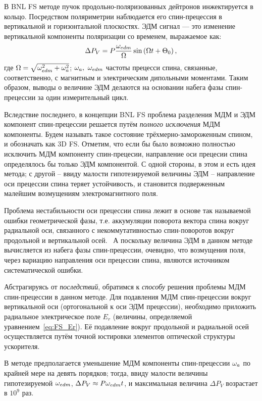 В BNL FS методе пучок продольно-поляризованных дейтронов инжектируется в кольцо. 
Посредством поляриметрии наблюдается его спин-прецессия в вертикальной и горизонтальной плоскостях. 
ЭДМ сигнал --- это изменение вертикальной компоненты поляризации со временем, 
выражаемое как:~\cite[стр.~8]{BNL:Deuteron2008}
\begin{equation}
  \Delta P_V = P\frac{\w_{edm}}{\W}\sin\bkt{\W t + \Theta_0},
\end{equation}
где $\Omega = \sqrt{\omega_{edm}^2 + \omega_a^2}$; $\omega_a,~\omega_{edm}$ частоты прецесси спина,
связанные, соответственно, с магнитным и электрическим дипольными моментами. 
Таким образом, выводы о величине ЭДМ делаются на основании набега фазы спин-прецессии 
за один измерительный цикл.

Вследствие последнего, в концепции BNL FS проблема разделения МДМ и ЭДМ компонент спин-прецессии
решается путём \emph{полного исключения} МДМ компоненты. 
Будем называть такое состояние  трёхмерно-замороженным спином, и обозначать как 3D FS. 
Отметим, что если бы было возможно полностью исключить МДМ компоненту спин-прецесии, 
направление оси прецесии спина определялось бы только ЭДМ компонентой.
С одной стороны, в этом и есть идея метода; с другой -- ввиду малости гипотезируемой величины ЭДМ --
направление оси прецессии спина теряет устойчивость, и становится подверженным малейшим возмущениям
электромагнитного поля. 

Проблема нестабильности оси прецессии спина лежит в основе так называемой 
ошибки геометрической фазы, т.е. аккумуляции поворота вектора спина вокруг радиальной оси, 
связанного с некоммутативностью спин-поворотов 
вокруг продольной и вертикальной осей.~\cite[стр.~23]{BNL:Deuteron2008} 
А поскольку величина ЭДМ в данном методе вычисляется из набега фазы спин-прецессии, очевидно, что
возмущения поля, через вариацию направления оси прецессии спина, являются источником
систематической ошибки.

Абстрагируясь от \emph{последствий}, обратимся к \emph{способу} решения проблемы 
МДМ спин-прецессии в данном методе.
Для подавления МДМ спин-прецессии вокруг вертикальной оси 
(ортогональной к оси ЭДМ прецессии), необходимо приложить
 радиальное электрическое поле $E_r$ (величины, определяемой уравнением~\eqref{eq:FS_Er}). 
Её подавление вокруг продольной и радиальной осей осуществляется путём
точной юстировки элементов оптической структуры ускорителя.

В методе предполагается уменьшение МДМ компоненты спин-прецессии $\omega_a$ 
по крайней мере на девять порядков; тогда, ввиду
малости величины гипотезируемой $\omega_{edm}$, ${\Delta P_V\approx P\omega_{edm} t}$, 
и максимальная величина $\Delta P_V$ возрастает в $10^9$ раз.

